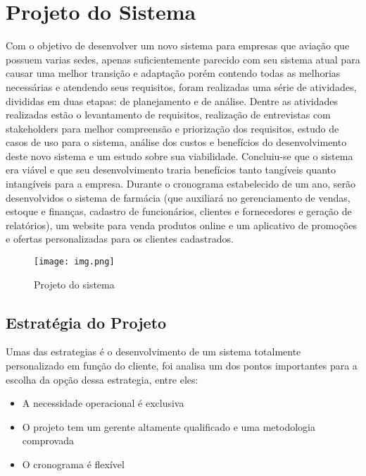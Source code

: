 
\chapter{Projeto do Sistema}

Com o objetivo de desenvolver um novo sistema para empresas que aviação que 
possuem varias sedes, apenas suficientemente parecido
com seu sistema atual para causar uma melhor transição e adaptação porém contendo todas as
melhorias necessárias e atendendo seus requisitos, foram realizadas uma série de atividades, divididas
em duas etapas: de planejamento e de análise.
Dentre as atividades realizadas estão o levantamento de requisitos, realização de entrevistas com
stakeholders para melhor compreensão e priorização dos requisitos, estudo de casos de uso para o
sistema, análise dos custos e benefícios do desenvolvimento deste novo sistema e um estudo sobre
sua viabilidade.
Concluiu-se que o sistema era viável e que seu 
desenvolvimento traria benefícios tanto tangíveis
quanto intangíveis para a empresa. 
Durante o cronograma estabelecido de um ano, serão
desenvolvidos o sistema de farmácia (que auxiliará no gerenciamento de vendas, estoque e finanças,
cadastro de funcionários, clientes e fornecedores e geração de relatórios), um website para venda
produtos online e um aplicativo de promoções e ofertas personalizadas para os clientes cadastrados.

\begin{figure}[!ht]
    \caption{Projeto do sistema}
    \centering
    \texttt{[image: img.png]}
\end{figure}
\section{Estrat\'{e}gia do Projeto}
Umas das estrategias é o desenvolvimento de um sistema totalmente 
personalizado em função do cliente, foi analisa um dos pontos importantes
para a escolha da opção dessa estrategia, entre eles:
\begin{itemize}
    \item A necessidade operacional é exclusiva
    \item O projeto tem um
          gerente altamente
          qualificado e uma
          metodologia comprovada
    \item O cronograma é flexível
\end{itemize}

